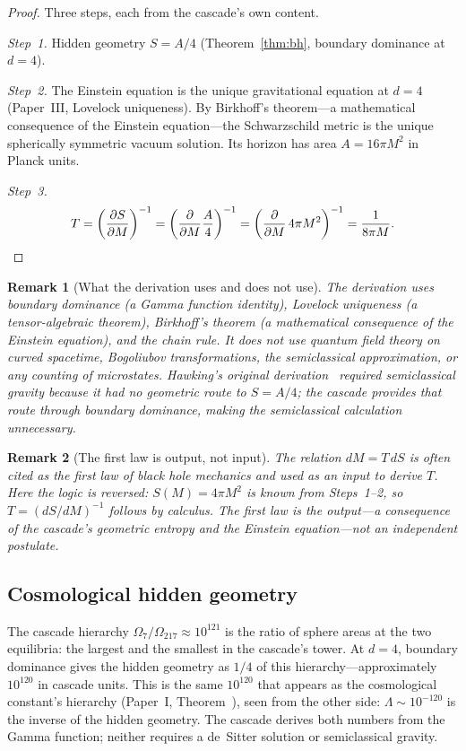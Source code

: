 \documentclass[12pt,a4paper]{article}
\newtheorem*{remark}{Remark}
\begin{document}
\begin{proof}
Three steps, each from the cascade's own content.

\emph{Step~1.} Hidden geometry $S = A/4$ (Theorem~\ref{thm:bh}, boundary
dominance at $d = 4$).

\emph{Step~2.} The Einstein equation is the unique gravitational equation at
$d = 4$ (Paper~III, Lovelock uniqueness). By Birkhoff's theorem---a
mathematical consequence of the Einstein equation---the Schwarzschild metric
is the unique spherically symmetric vacuum solution. Its horizon has area
$A = 16\pi M^2$ in Planck units.

\emph{Step~3.}
\[
T = \left(\frac{\partial S}{\partial M}\right)^{-1}
= \left(\frac{\partial}{\partial M}\frac{A}{4}\right)^{-1}
= \left(\frac{\partial}{\partial M}\,4\pi M^2\right)^{-1}
= \frac{1}{8\pi M}.\qedhere
\]
\end{proof}

\begin{remark}[What the derivation uses and does not use]
The derivation uses boundary dominance (a Gamma function identity),
Lovelock uniqueness (a tensor-algebraic theorem), Birkhoff's theorem
(a mathematical consequence of the Einstein equation), and the chain rule.
It does not use quantum field theory on curved spacetime, Bogoliubov
transformations, the semiclassical approximation, or any counting of
microstates. Hawking's original derivation~\cite{hawking75} required
semiclassical gravity because it had no geometric route to $S = A/4$; the
cascade provides that route through boundary dominance, making the
semiclassical calculation unnecessary.
\end{remark}

\begin{remark}[The first law is output, not input]
The relation $dM = T\,dS$ is often cited as the first law of black hole
mechanics and used as an input to derive $T$. Here the logic is reversed:
$S(M) = 4\pi M^2$ is known from Steps~1--2, so $T = (dS/dM)^{-1}$ follows
by calculus. The first law is the \emph{output}---a consequence of the
cascade's geometric entropy and the Einstein equation---not an independent
postulate.
\end{remark}

\subsection{Cosmological hidden geometry}

The cascade hierarchy $\Omega_7/\Omega_{217} \approx 10^{121}$ is the ratio
of sphere areas at the two equilibria: the largest and the smallest in the
cascade's tower. At $d = 4$, boundary dominance gives the hidden geometry
as $1/4$ of this hierarchy---approximately $10^{120}$ in cascade units.
This is the same $10^{120}$ that appears as the cosmological constant's
hierarchy (Paper~I, Theorem~), seen from the other side: $\Lambda \sim
10^{-120}$ is the inverse of the hidden geometry. The cascade derives both
numbers from the Gamma function; neither requires a de~Sitter solution or
semiclassical gravity.
\end{document}
